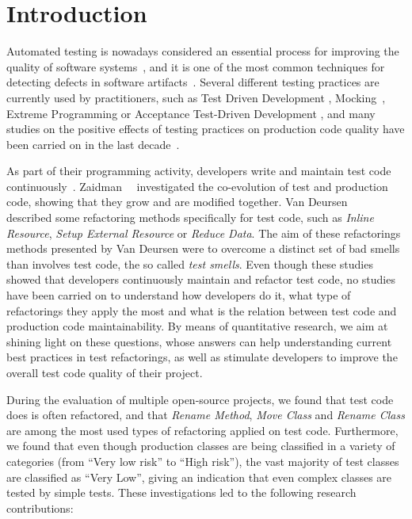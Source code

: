 
\section{Introduction}
Automated testing is nowadays considered an essential process for 
improving the quality of software systems~\cite{Bertolino2007,Myers2004}, and it is
one of the most common techniques for detecting defects in 
software artifacts~\cite{laitenberger1998studying,van2001refactoring}.
Several different testing
practices are currently used by practitioners, such as Test Driven Development
\cite{erdogmus2010test}, Mocking~\cite{Spadini}, Extreme Programming \cite{lindstrom2004extreme} or
Acceptance Test-Driven Development \cite{aggarwal2014acceptance}, and many studies on the 
positive effects of testing practices on production code quality have
been carried on in the last decade~\cite{laitenberger1998studying,binder1996testing}. 

As part of their programming activity, developers write and maintain test code 
continuously~\cite{van2001refactoring}. Zaidman~\etal~\cite{Zaidman2008} investigated the
co-evolution of test and production code, showing that they grow and are modified together.
Van Deursen~\etal~\cite{van2001refactoring} described some refactoring methods 
specifically for test code, such as \textit{Inline Resource}, \textit{Setup External Resource}
or \textit{Reduce Data}. The aim of these refactorings methods presented by Van Deursen were
to overcome a distinct set of bad smells than involves test code, the so called \textit{test smells}.
Even though these studies showed that developers continuously maintain and refactor test code, 
no studies have been carried on to understand how developers do it, what type of refactorings they apply the most
and what is the relation between test code and production code maintainability. 
By means of quantitative research, we aim at shining light on these questions, whose answers
can help understanding current best practices in test refactorings, as well as
stimulate developers to improve the overall test code quality of their project.

During the evaluation of multiple open-source projects, we found that
test code does is often refactored, and that \emph{Rename Method}, \emph{Move Class} and \emph{Rename Class} are among the most used types of refactoring applied on test code. Furthermore, we found that 
even though production classes are being classified in a variety of categories (from ``Very low risk'' to ``High risk''), the vast majority of test classes are classified as ``Very Low'', giving an indication that even complex
classes are tested by simple tests. 
These investigations led to the following
research contributions:

